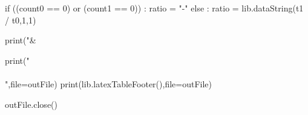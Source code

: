         if ((count0 == 0) or (count1 == 0)) :
            ratio = "-"
        else :
            ratio = lib.dataString(t1 / t0,1,1)

        print("& %

    print("\\\\",file=outFile)
print(lib.latexTableFooter(),file=outFile)

outFile.close()
